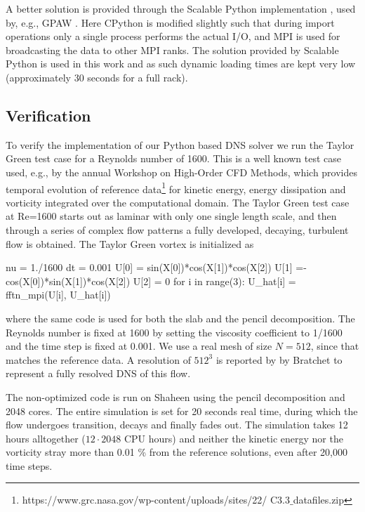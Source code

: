 \documentclass[final,1p,times]{elsarticle}
\begin{document}
A better solution is provided through the Scalable Python implementation \cite{scalablepython, Enkovaara201117}, used by, e.g., GPAW \cite{gpaw05}. Here CPython is modified slightly such that during import operations only a single process performs the actual I/O, and MPI is used for broadcasting the data to other MPI ranks. The solution provided by Scalable Python is used in this work and as such dynamic loading times are kept very low (approximately 30 seconds for a full rack).

\subsection{Verification}
\label{sec:verification}
To verify the implementation of our Python based DNS solver we run the Taylor Green test case for a Reynolds number of 1600. This is a well known test case used, e.g., by the annual Workshop on High-Order CFD Methods, which provides temporal evolution of reference data\footnote{https://www.grc.nasa.gov/wp-content/uploads/sites/22/ C3.3$\_$datafiles.zip} for kinetic energy, energy dissipation and vorticity integrated over the computational domain. The Taylor Green test case at Re=1600 starts out as laminar with only one single length scale, and then through a series of complex flow patterns a fully developed, decaying, turbulent flow is obtained. The Taylor Green vortex is initialized as
\begin{python}
nu = 1./1600
dt = 0.001
U[0] = sin(X[0])*cos(X[1])*cos(X[2])
U[1] =-cos(X[0])*sin(X[1])*cos(X[2])
U[2] = 0
for i in range(3):
    U_hat[i] = fftn_mpi(U[i], U_hat[i])
\end{python}
where the same code is used for both the slab and the pencil decomposition. The Reynolds number is fixed at 1600 by setting the viscosity coefficient to 1/1600 and the time step is fixed at 0.001. We use a real mesh of size $N=512$, since that matches the reference data. A resolution of $512^3$ is reported by by Bratchet \cite{brachet1991direct} to represent a fully resolved DNS of this flow.

The non-optimized code is run on Shaheen using the pencil decomposition and 2048 cores. The entire simulation is set for 20 seconds real time, during which the flow undergoes transition, decays and finally fades out. The simulation takes 12 hours alltogether ($12\cdot2048$ CPU hours) and neither the kinetic energy nor the vorticity stray more than 0.01 \% from the reference solutions, even after 20,000 time steps.
\end{document}
